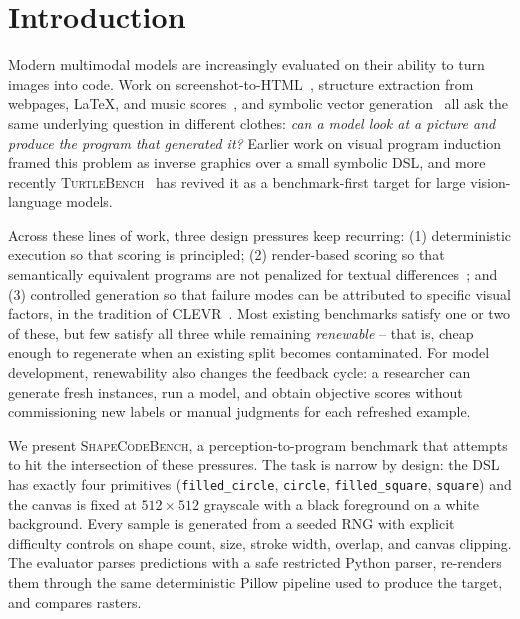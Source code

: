 \section{Introduction}
\label{sec:intro}

Modern multimodal models are increasingly evaluated on their ability to turn
images into code. Work on screenshot-to-HTML~\cite{beltramelli2017pix2code,si2024design2code},
structure extraction from webpages, LaTeX, and music
scores~\cite{roberts2024image2struct}, and symbolic vector
generation~\cite{lin2025vcode,zhou2026omni} all ask the same underlying question
in different clothes: \emph{can a model look at a picture and produce the program
that generated it?} Earlier work on visual program
induction~\cite{sharma2018csgnet,liu2019scenes,li2020perspective,li2020multiplane,duan2022parametric,grand2024lilo}
framed this problem as inverse graphics over a small symbolic DSL, and more
recently \textsc{TurtleBench}~\cite{rismanchian2025turtlebench} has revived it
as a benchmark-first target for large vision-language models.

Across these lines of work, three design pressures keep recurring: (1) deterministic
execution so that scoring is principled; (2) render-based scoring so that
semantically equivalent programs are not penalized for textual
differences~\cite{roberts2024image2struct}; and (3) controlled generation so that
failure modes can be attributed to specific visual factors, in the tradition of
\textsc{CLEVR}~\cite{johnson2017clevr,bahdanau2019closure}. Most existing
benchmarks satisfy one or two of these, but few satisfy all three while remaining
\emph{renewable} -- that is, cheap enough to regenerate when an existing split
becomes contaminated. For model development, renewability also changes the
feedback cycle: a researcher can generate fresh instances, run a model, and
obtain objective scores without commissioning new labels or manual judgments for
each refreshed example.

We present \textsc{ShapeCodeBench}, a perception-to-program benchmark that attempts to
hit the intersection of these pressures. The task is narrow by design: the DSL
has exactly four primitives (\texttt{filled\_circle}, \texttt{circle},
\texttt{filled\_square}, \texttt{square}) and the canvas is fixed at
$512{\times}512$ grayscale with a black foreground on a white background. Every
sample is generated from a seeded RNG with explicit difficulty controls on shape
count, size, stroke width, overlap, and canvas clipping. The evaluator parses
predictions with a safe restricted Python parser, re-renders them through the
same deterministic Pillow pipeline used to produce the target, and compares
rasters.

